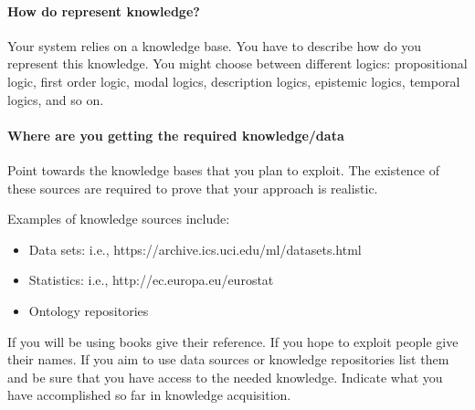 \documentclass[a4paper,12pt]{report}
\begin{document}
\paragraph{How do represent knowledge?} 
Your system relies on a knowledge base.
You have to describe how do you represent this knowledge.
You might choose between different logics: 
propositional logic, first order logic, modal logics, description logics, epistemic logics, 
temporal logics, and so on. 

\paragraph{Where are you getting the required knowledge/data}
Point towards the knowledge bases that you plan to exploit. 
The existence of these sources are required to prove that your approach is realistic.

Examples of knowledge sources include:
\begin{itemize}
\item Data sets: i.e., https://archive.ics.uci.edu/ml/datasets.html 
\item Statistics: i.e., http://ec.europa.eu/eurostat 
\item Ontology repositories 
\end{itemize}


If you will be using books give their reference. 
If you hope to exploit people give their names.
If you aim to use data sources or knowledge repositories list them and be sure that you have 
access to the needed knowledge. Indicate what you have accomplished so far in knowledge acquisition. 
\end{document}
